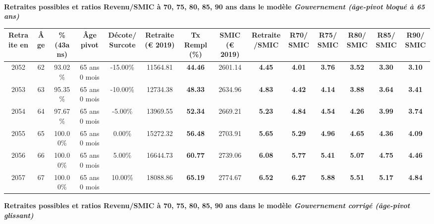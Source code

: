  ~\\{\bf \noindent Retraites possibles et ratios Revenu/SMIC à 70, 75, 80, 85, 90 ans dans le modèle \emph{Gouvernement (âge-pivot bloqué à 65 ans)}}  
 
\begin{adjustbox}{max width=\textwidth} 
\begin{tabular}[htb]{|c|c||c|c|c||c|c||c|c||c|c|c|c|c|} 
\hline 
 Retraite en &  Âge &  \%(43ans) &  Âge pivot &  Décote/Surcote &  Retraite (\euro{} 2019) &  Tx Rempl(\%) &  SMIC (\euro{} 2019) &  Retraite/SMIC &  R70/SMIC &  R75/SMIC &  R80/SMIC &  R85/SMIC &  R90/SMIC \\ 
\hline \hline 
 2052 &  62 &  93.02\% &  65 ans 0 mois &  -15.00\% &  11564.81 &  {\bf 44.46} &  2601.14 &  {\bf 4.45} &  {\bf 4.01} &  {\bf 3.76} &  {\bf 3.52} &  {\bf 3.30} &  {\bf 3.10} \\ 
\hline 
 2053 &  63 &  95.35\% &  65 ans 0 mois &  -10.00\% &  12734.38 &  {\bf 48.33} &  2634.96 &  {\bf 4.83} &  {\bf 4.42} &  {\bf 4.14} &  {\bf 3.88} &  {\bf 3.64} &  {\bf 3.41} \\ 
\hline 
 2054 &  64 &  97.67\% &  65 ans 0 mois &  -5.00\% &  13969.55 &  {\bf 52.34} &  2669.21 &  {\bf 5.23} &  {\bf 4.84} &  {\bf 4.54} &  {\bf 4.26} &  {\bf 3.99} &  {\bf 3.74} \\ 
\hline 
 2055 &  65 &  100.00\% &  65 ans 0 mois &  0.00\% &  15272.32 &  {\bf 56.48} &  2703.91 &  {\bf 5.65} &  {\bf 5.29} &  {\bf 4.96} &  {\bf 4.65} &  {\bf 4.36} &  {\bf 4.09} \\ 
\hline 
 2056 &  66 &  100.00\% &  65 ans 0 mois &  5.00\% &  16644.73 &  {\bf 60.77} &  2739.06 &  {\bf 6.08} &  {\bf 5.77} &  {\bf 5.41} &  {\bf 5.07} &  {\bf 4.75} &  {\bf 4.46} \\ 
\hline 
 2057 &  67 &  100.00\% &  65 ans 0 mois &  10.00\% &  18088.86 &  {\bf 65.19} &  2774.67 &  {\bf 6.52} &  {\bf 6.27} &  {\bf 5.88} &  {\bf 5.51} &  {\bf 5.17} &  {\bf 4.84} \\ 
\hline 
\hline 
\end{tabular} 
\end{adjustbox} 
 
 \vspace{0.1cm} 
{\bf \noindent Retraites possibles et ratios Revenu/SMIC à 70, 75, 80, 85, 90 ans dans le modèle \emph{Gouvernement corrigé (âge-pivot glissant)}}  
 
